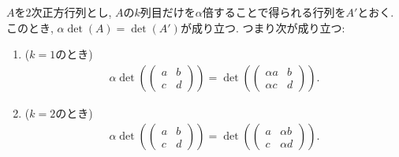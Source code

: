 \begin{theorem}
  \label{thm:multlin:col:prod}
  $A$を$2$次正方行列とし,
  $A$の$k$列目だけを$\alpha$倍することで得られる行列を$A'$とおく.
  このとき, $\alpha\det(A)=\det(A')$が成り立つ.
  つまり次が成り立つ:
  \begin{enumerate}
    \item ($k=1$のとき)
      \begin{align*}
        \alpha\det(\begin{pmatrix}a&b\\c&d\end{pmatrix})
          =
       \det(\begin{pmatrix}\alpha  a&b\\\alpha c&d\end{pmatrix}).
      \end{align*}
    \item ($k=2$のとき)
      \begin{align*}
        \alpha\det(\begin{pmatrix}a&b\\c&d\end{pmatrix})
          =
       \det(\begin{pmatrix}a&\alpha b\\c&\alpha  d\end{pmatrix}).
      \end{align*}
  \end{enumerate}
\end{theorem}




